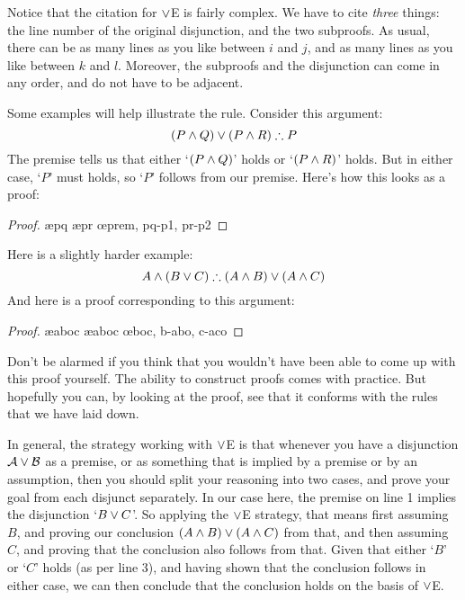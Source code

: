 Notice that the citation for $\vee$E is fairly complex.  We have to cite \emph{three} things: the line number of the original disjunction, and the two subproofs.  As usual, there can be as many lines as you like between $i$ and $j$, and as many lines as you like between $k$ and $l$. Moreover, the subproofs and the disjunction can come in any order, and do not have to be adjacent.

Some examples will help illustrate the rule. Consider this argument:
$$(P \wedge Q) \vee (P \wedge R) \therefore P$$
The premise tells us that either `$(P \wedge Q)$' holds or `$(P \wedge R)$' holds.  But in either case, `$P$' must holds, so `$P$' follows from our premise.  Here's how this looks as a proof:
	\begin{proof}
			\open
				\ae{pq}
			\close
			\open
				\ae{pr}
			\close
		\oe{prem, pq-p1, pr-p2}
	\end{proof}
	
Here is a slightly harder example:
	$$ A \wedge (B \vee C) \therefore (A \wedge B) \vee (A \wedge C)$$
And here is a proof corresponding to this argument:
	\begin{proof}
		\ae{aboc}
		\ae{aboc}
		\open
		\close
		\open
		\close
	\oe{boc, b-abo, c-aco}
	\end{proof}
Don't be alarmed if you think that you wouldn't have been able to come up with this proof yourself. The ability to construct proofs comes with practice. But hopefully you can, by looking at the proof,  see that it conforms with the rules that we have laid down.

In general, the strategy working with $\vee$E is that whenever you have a disjunction $\mathcal{A} \vee \mathcal{B}$ as a premise, or as something that is implied by a premise or by an assumption, then you should split your reasoning into two cases, and prove your goal from each disjunct separately.  In our case here, the premise on line 1 implies the disjunction `$B \vee C$'.  So applying the $\vee$E strategy, that means first assuming $B$, and proving our conclusion $(A \wedge B) \vee (A \wedge C)$ from that, and then assuming $C$, and proving that the conclusion also follows from that.  Given that either `$B$' or `$C$' holds (as per line 3), and having shown that the conclusion follows in either case, we can then conclude that the conclusion holds on the basis of $\vee$E.


